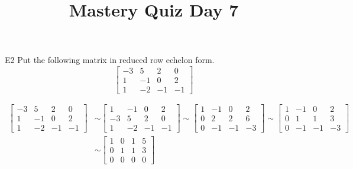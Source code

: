 \documentclass{sbgLAquiz}
\title{Mastery Quiz Day 7 }
\begin{document}
\begin{problem}{E2}
Put the following matrix in reduced row echelon form.
$$\begin{bmatrix}-3 & 5 & 2 & 0 \\ 1 & -1 & 0 & 2 \\ 1 & -2 & -1 & -1 \end{bmatrix}$$
\end{problem}
\begin{solution}
\begin{align*}
\begin{bmatrix}
-3 & 5 & 2 & 0 \\
 1 & -1 & 0 & 2 \\
 1 & -2 & -1 & -1 
\end{bmatrix} &\sim
\begin{bmatrix}
 1 & -1 & 0 & 2 \\
-3 & 5 & 2 & 0 \\
 1 & -2 & -1 & -1 
\end{bmatrix} \sim
\begin{bmatrix}
 1 & -1 & 0 & 2 \\
 0 & 2 & 2 & 6 \\
 0 & -1 & -1 & -3 
\end{bmatrix} \sim
\begin{bmatrix}
 1 & -1 & 0 & 2 \\
 0 & 1 & 1 & 3 \\
 0 & -1 & -1 & -3 
\end{bmatrix} \\ &\sim
\begin{bmatrix}
 1 & 0 & 1 & 5 \\
 0 & 1 & 1 & 3 \\
 0 & 0 & 0 & 0 
\end{bmatrix} 
\end{align*}
\end{solution}
\end{document}
